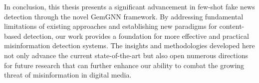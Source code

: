 In conclusion, this thesis presents a significant advancement in few-shot fake news detection through the novel GemGNN framework. By addressing fundamental limitations of existing approaches and establishing new paradigms for content-based detection, our work provides a foundation for more effective and practical misinformation detection systems. The insights and methodologies developed here not only advance the current state-of-the-art but also open numerous directions for future research that can further enhance our ability to combat the growing threat of misinformation in digital media.

\EndChapter

